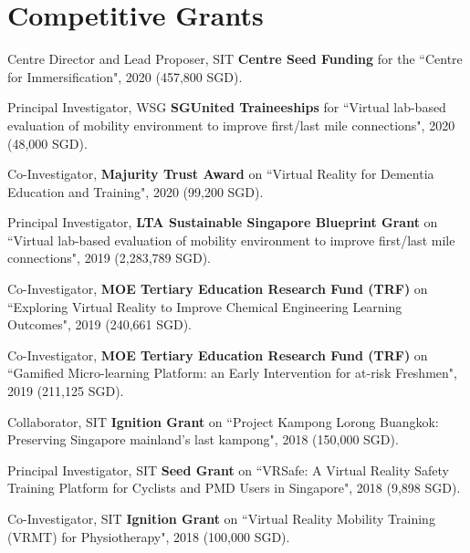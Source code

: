 \documentclass[10pt,a4paper]{article}
\renewenvironment{itemize}{
    \begin{list}{}{
            \setlength{\leftmargin}{1.5em}
            \setlength{\itemsep}{0.25em}
            \setlength{\parskip}{0pt}
            \setlength{\parsep}{0.25em}
        }
        }{
    \end{list}
}
\begin{document}


\section*{Competitive Grants}

\begin{itemize}

    \item Centre Director and Lead Proposer, SIT \textbf{Centre Seed Funding} for the ``Centre for Immersification", 2020 (457,800 SGD).

    \item Principal Investigator, WSG \textbf{SGUnited Traineeships} for ``Virtual lab-based evaluation of mobility environment to improve first/last mile connections", 2020 (48,000 SGD).

    \item Co-Investigator, \textbf{Majurity Trust Award} on ``Virtual Reality for Dementia Education and Training", 2020 (99,200 SGD).
        
    \item Principal Investigator, \textbf{LTA Sustainable Singapore Blueprint Grant} on ``Virtual lab-based evaluation of mobility environment to improve first/last mile connections", 2019 (2,283,789 SGD).

    \item Co-Investigator, \textbf{MOE Tertiary Education Research Fund (TRF)} on ``Exploring Virtual Reality to Improve Chemical Engineering Learning Outcomes", 2019 (240,661 SGD).

    \item Co-Investigator, \textbf{MOE Tertiary Education Research Fund (TRF)} on ``Gamified Micro-learning Platform: an Early Intervention for at-risk Freshmen", 2019 (211,125 SGD).

    \item Collaborator, SIT \textbf{Ignition Grant} on ``Project Kampong Lorong Buangkok: Preserving Singapore mainland's last kampong", 2018 (150,000 SGD).

    \item Principal Investigator, SIT \textbf{Seed Grant} on ``VRSafe: A Virtual Reality Safety Training Platform for Cyclists and PMD Users in Singapore", 2018 (9,898 SGD).

    \item Co-Investigator, SIT \textbf{Ignition Grant} on ``Virtual Reality Mobility Training (VRMT) for Physiotherapy", 2018 (100,000 SGD).


\end{itemize}
\end{document}
